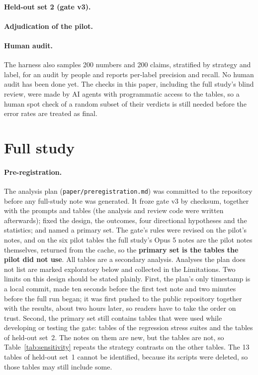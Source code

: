 \documentclass[11pt]{article}
\begin{document}
\paragraph{Held-out set 2 (gate v3).} \HeldTwo{}

\paragraph{Adjudication of the pilot.} \Adjudication{}

\paragraph{Human audit.} The harness also samples 200 numbers and 200 claims, stratified by strategy and label, for an audit by people and reports per-label precision and recall. No human audit has been done yet. The checks in this paper, including the full study's blind review, were made by AI agents with programmatic access to the tables, so a human spot check of a random subset of their verdicts is still needed before the error rates are treated as final.

\section{Full study}
\label{sec:full}

\paragraph{Pre-registration.} The analysis plan (\texttt{paper/preregistration.md}) was committed to the repository before any full-study note was generated. It froze gate v3 by checksum, together with the prompts and tables (the analysis and review code were written afterwards); fixed the design, the outcomes, four directional hypotheses and the statistics; and named a primary set. The gate's rules were revised on the pilot's notes, and on the six pilot tables the full study's Opus 5 notes are the pilot notes themselves, returned from the cache, so the \textbf{primary set is the \FullPrimaryTables{} tables the pilot did not use}. All \FullTables{} tables are a secondary analysis. Analyses the plan does not list are marked exploratory below and collected in the Limitations. Two limits on this design should be stated plainly. First, the plan's only timestamp is a local commit, made ten seconds before the first test note and two minutes before the full run began; it was first pushed to the public repository together with the results, about two hours later, so readers have to take the order on trust. Second, the primary set still contains \DevTables{} tables that were used while developing or testing the gate: \DevStress{} tables of the regression stress suites and the \DevHeld{} tables of held-out set~2. The notes on them are new, but the tables are not, so Table~\ref{tab:sensitivity} repeats the strategy contrasts on the other \CleanTables{} tables. The 13 tables of held-out set~1 cannot be identified, because its scripts were deleted, so those \CleanTables{} tables may still include some.
\end{document}

